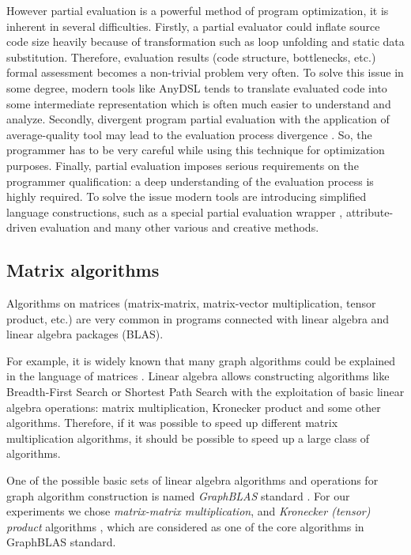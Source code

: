 \documentclass[conference]{IEEEtran}
\begin{document}
However partial evaluation is a powerful method of program optimization, it is inherent in several difficulties. Firstly, a partial evaluator could inflate source code size heavily because of transformation such as loop unfolding and static data substitution. Therefore, evaluation results (code structure, bottlenecks, etc.) formal assessment becomes a non-trivial problem very often. To solve this issue in some degree, modern tools like AnyDSL \cite{leissa2018anydsl} tends to translate evaluated code into some intermediate representation which is often much easier to understand and analyze. Secondly, divergent program partial evaluation with the application of average-quality tool may lead to the evaluation process divergence \cite{jones1993partial}. So, the programmer has to be very careful while using this technique for optimization purposes. Finally, partial evaluation imposes serious requirements on the programmer qualification: a deep understanding of the evaluation process is highly required. To solve the issue modern tools are introducing simplified language constructions, such as a special partial evaluation wrapper \cite{leissa2018anydsl}, attribute-driven evaluation \cite{10.1007/978-3-319-74313-4_27} and many other various and creative methods.

\subsection{Matrix algorithms}

Algorithms on matrices (matrix-matrix, matrix-vector multiplication, tensor product, etc.) are very common in programs connected with linear algebra and linear algebra packages (BLAS).

For example, it is widely known that many graph algorithms could be explained in the language of matrices \cite{kepner2011graph,davis2019algorithm}. Linear algebra allows constructing algorithms like Breadth-First Search or Shortest Path Search with the exploitation of basic linear algebra operations: matrix multiplication, Kronecker product and some other algorithms. Therefore, if it was possible to speed up different matrix multiplication algorithms, it should be possible to speed up a large class of algorithms. 

One of the possible basic sets of linear algebra algorithms and operations for graph algorithm construction is named \textit{GraphBLAS} standard \cite{davis2019algorithm,moreira2018implementing}. For our experiments we chose \textit{matrix-matrix multiplication}, and \textit{Kronecker (tensor) product} algorithms \cite{cormen2009introduction}, which are considered as one of the core algorithms in GraphBLAS standard.
\end{document}
